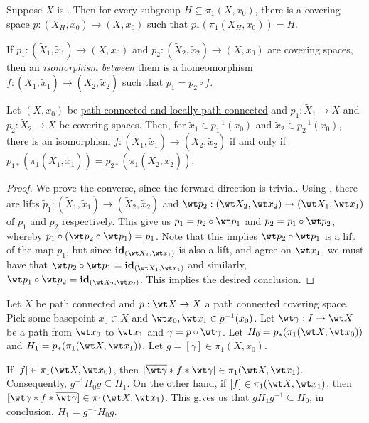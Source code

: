 \begin{theorem}
    Suppose $X$ is \nice. Then for every subgroup $H\subseteq\pi_1(X,x_0)$, there is a covering space $p: (X_H,\widetilde x_0)\to (X,x_0)$  such that $p_*(\pi_1(X_H,\widetilde{x}_0)) = H$.
\end{theorem}

If $p_1: (\widetilde X_1,\widetilde x_1)\to(X,x_0)$ and $p_2:(\widetilde X_2,\widetilde x_2)\to(X,x_0)$ are covering spaces, then an \textit{isomorphism between} them is a homeomorphism $f: (\widetilde X_1,\widetilde x_1)\to(\widetilde X_2,\widetilde x_2)$ such that $p_1 = p_2\circ f$.

\begin{theorem}
    Let $(X, x_0)$ be \underline{path connected and locally path connected} and $p_1:\widetilde X_1\to X$ and $p_2:\widetilde X_2\to X$ be covering spaces. Then, for $\widetilde x_1\in p_1^{-1}(x_0)$ and $\widetilde x_2\in p_2^{-1}(x_0)$, there is an isomorphism $f: (\widetilde X_1,\widetilde x_1)\to(\widetilde X_2,\widetilde x_2)$ if and only if $p_{1*}(\pi_1(\widetilde X_1,\widetilde x_1)) = p_{2*}(\pi_1(\widetilde{X}_2, \widetilde x_2))$.
\end{theorem}
\begin{proof}
    We prove the converse, since the forward direction is trivial. Using , there are lifts $\widetilde p_1: (\widetilde X_1,\widetilde x_1)\to(\widetilde X_2,\widetilde x_2)$ and $\wt p_2: (\wt X_2,\wt x_2)\to(\wt X_1,\wt x_1)$ of $p_1$ and $p_2$ respectively. This give us $p_1 = p_2\circ\wt p_1$ and $p_2 = p_1\circ\wt p_2$, whereby $p_1\circ(\wt p_2\circ\wt p_1) = p_1$. Note that this implies $\wt p_2\circ\wt p_1$ is a lift of the map $p_1$, but since $\mathbf{id}_{(\wt X_1,\wt x_1)}$ is also a lift, and agree on $\wt x_1$, we must have that $\wt p_2\circ\wt p_1 = \mathbf{id}_{(\wt X_1, \wt x_1)}$ and similarly, $\wt p_1\circ\wt p_2 = \mathbf{id}_{(\wt X_2,\wt x_2)}$. This implies the desired conclusion.
\end{proof}

Let $X$ be path connected and $p:\wt X\to X$ a path connected covering space. Pick some basepoint $x_0\in X$ and $\wt x_0,\wt x_1\in p^{-1}(x_0)$. Let $\wt\gamma: I\to\wt X$ be a path from $\wt x_0$ to $\wt x_1$ and $\gamma = p\circ\wt\gamma$. Let $H_0 = p_*(\pi_1(\wt X,\wt x_0))$ and $H_1 = p_*(\pi_1(\wt X, \wt x_1))$. Let $g = [\gamma]\in\pi_1(X,x_0)$. 

If $[f]\in\pi_1(\wt X,\wt x_0)$, then $[\overline{\wt\gamma} * f * \wt\gamma]\in\pi_1(\wt X,\wt x_1)$. Consequently, $g^{-1}H_0g\subseteq H_1$. On the other hand, if $[f]\in\pi_1(\wt X,\wt x_1)$, then $[\wt\gamma * f * \overline{\wt \gamma}]\in\pi_1(\wt X,\wt x_1)$. This gives us that $gH_1g^{-1}\subseteq H_0$, in conclusion, $H_1 = g^{-1}H_0g$.

